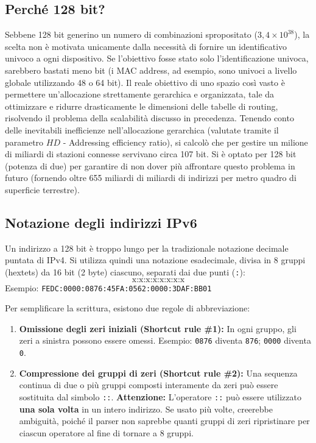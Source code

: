 \subsection{Perché 128 bit?}
Sebbene 128 bit generino un numero di combinazioni spropositato ($3,4 \times 10^{38}$), la scelta non è motivata unicamente dalla necessità di fornire un identificativo univoco a ogni dispositivo. Se l'obiettivo fosse stato solo l'identificazione univoca, sarebbero bastati meno bit (i MAC address, ad esempio, sono univoci a livello globale utilizzando 48 o 64 bit). 
Il reale obiettivo di uno spazio così vasto è permettere un'allocazione strettamente gerarchica e organizzata, tale da ottimizzare e ridurre drasticamente le dimensioni delle tabelle di routing, risolvendo il problema della scalabilità discusso in precedenza. 
Tenendo conto delle inevitabili inefficienze nell'allocazione gerarchica (valutate tramite il parametro $HD$ - Addressing efficiency ratio), si calcolò che per gestire un milione di miliardi di stazioni connesse servivano circa 107 bit. Si è optato per 128 bit (potenza di due) per garantire di non dover più affrontare questo problema in futuro (fornendo oltre 655 miliardi di miliardi di indirizzi per metro quadro di superficie terrestre).

\subsection{Notazione degli indirizzi IPv6}
Un indirizzo a 128 bit è troppo lungo per la tradizionale notazione decimale puntata di IPv4. Si utilizza quindi una notazione esadecimale, divisa in 8 gruppi (hextets) da 16 bit (2 byte) ciascuno, separati dai due punti (\texttt{:}):
\[ \text{x:x:x:x:x:x:x:x} \]
Esempio: \texttt{FEDC:0000:0876:45FA:0562:0000:3DAF:BB01}

Per semplificare la scrittura, esistono due regole di abbreviazione:
\begin{enumerate}
    \item \textbf{Omissione degli zeri iniziali (Shortcut rule \#1):} In ogni gruppo, gli zeri a sinistra possono essere omessi. Esempio: \texttt{0876} diventa \texttt{876}; \texttt{0000} diventa \texttt{0}.
    \item \textbf{Compressione dei gruppi di zeri (Shortcut rule \#2):} Una sequenza continua di due o più gruppi composti interamente da zeri può essere sostituita dal simbolo \texttt{::}.
    \textbf{Attenzione:} L'operatore \texttt{::} può essere utilizzato \textbf{una sola volta} in un intero indirizzo. Se usato più volte, creerebbe ambiguità, poiché il parser non saprebbe quanti gruppi di zeri ripristinare per ciascun operatore al fine di tornare a 8 gruppi.
\end{enumerate}

